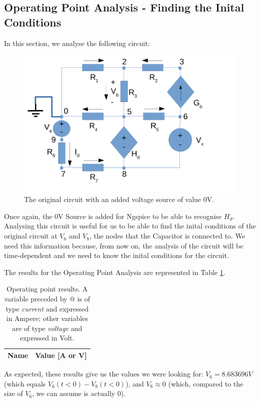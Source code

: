 \newpage

\subsection{Operating Point Analysis - Finding the Inital Conditions}

In this section, we analyse the following circuit:

 

\begin{figure}[h] \centering
\includegraphics[width=0.5\linewidth]{t2-sim2.pdf}
\caption{The original circuit with an added voltage source of value 0V.}
\label{fig:sim2}
\end{figure}

Once again, the 0V Source is added for Ngspice to be able to recognise $H_d$.
Analysing this circuit is useful for us to be able to find the inital conditions of the original circuit at $V_6$ and $V_8$, the nodes that the Capacitor is connected to. We need this information because, from now on, the analysis of the circuit will be time-dependent and we need to know the inital conditions for the circuit.

The results for the Operating Point Analysis are represented in Table \ref{tab:sim2}.

 

\begin{table}[htb!]
  \centering
  \begin{tabular}{|l|r|}
    \hline    
    {\bf Name} & {\bf Value [A or V]} \\ \hline
    
  \end{tabular}
  \caption{Operating point results. A variable preceded by @ is of type {\em current}
    and expressed in Ampere; other variables are of type {\it voltage} and expressed in
    Volt.}
  \label{tab:sim2}
\end{table}

As expected, these results give us the values we were looking for: $V_6 = 8.683696V$ (which equals $V_6(t < 0) - V_8(t < 0)$), and $V_8 \approx 0$ (which, compared to the size of $V_6$, we can assume is actually 0).



